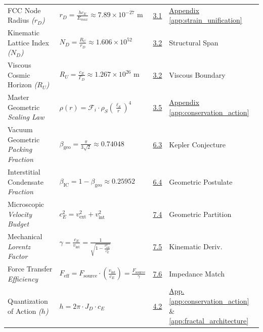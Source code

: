 \begin{longtable}{@{} p{4.5cm} p{6cm} c p{4cm} @{}}
FCC Node Radius \newline \textit{($r_D$)} & $r_D = \frac{h c_E}{E_{max}} \approx 7.89 \times 10^{-27} \text{ m}$ & \hyperref[sec:3.1]{3.1} & \hyperref[app:strain_unification]{Appendix \ref*{app:strain_unification}} \\

Kinematic Lattice Index \newline \textit{($N_D$)} & $N_D = \frac{R_U}{r_D} \approx 1.606 \times 10^{52}$ & \hyperref[sec:3.2]{3.2} & Structural Span \\

Viscous Cosmic Horizon \newline \textit{($R_U$)} & $R_U = \frac{c_E}{\Gamma_D} \approx 1.267 \times 10^{26} \text{ m}$ & \hyperref[sec:3.2]{3.2} & Viscous Boundary \\

Master Geometric \newline \textit{Scaling Law} & $\rho(r) = \mathcal{F}_i \cdot \rho_S \left(\frac{\ell_S}{r}\right)^4$ & \hyperref[sec:3.5]{3.5} & \hyperref[app:conservation_action]{Appendix \ref*{app:conservation_action}} \\

Vacuum Geometric \newline \textit{Packing Fraction} & $\beta_{\text{geo}} = \frac{\pi}{3\sqrt{2}} \approx 0.74048$ & \hyperref[sec:6.3]{6.3} & Kepler Conjecture \\

Interstitial Condensate \newline \textit{Fraction} & $\beta_{\text{IC}} = 1 - \beta_{\text{geo}} \approx 0.25952$ & \hyperref[sec:6.4]{6.4} & Geometric Postulate \\

Microscopic \newline \textit{Velocity Budget} & $c_E^2 = v_{\text{ext}}^2 + v_{\text{int}}^2$ & \hyperref[sec:7.4]{7.4} & Geometric Partition \\

Mechanical \newline \textit{Lorentz Factor} & $\gamma = \frac{c_E}{v_{\text{int}}} = \frac{1}{\sqrt{1 - \frac{v_{\text{ext}}^2}{c_E^2}}}$ & \hyperref[sec:7.5]{7.5} & Kinematic Deriv. \\

Force Transfer \newline \textit{Efficiency} & $F_{\text{eff}} = F_{\text{source}} \cdot \left(\frac{v_{\text{int}}}{c_E}\right) = \frac{F_{\text{source}}}{\gamma}$ & \hyperref[sec:7.6]{7.6} & Impedance Match \\

Quantization of Action \newline \textit{($h$)} & $h = 2\pi \cdot J_D \cdot c_E$ & \hyperref[sec:4.2]{4.2} & \hyperref[app:conservation_action]{App. \ref*{app:conservation_action}} \& \hyperref[app:fractal_architecture]{\ref*{app:fractal_architecture}} \\

\bottomrule
\end{longtable}


